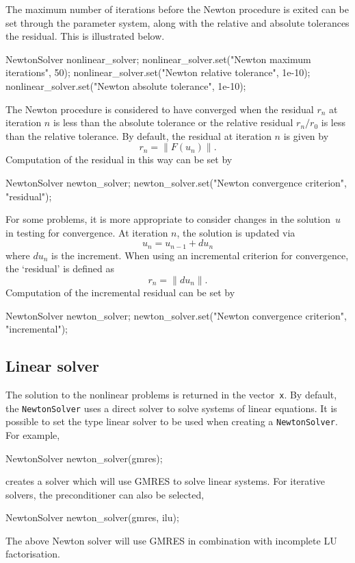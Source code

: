 The maximum number of iterations before the Newton 
procedure is exited can be set through the \dolfin{} parameter
system, along with the relative and absolute 
tolerances the residual. This is illustrated below.
%
\begin{code}
NewtonSolver nonlinear_solver;
nonlinear_solver.set("Newton maximum iterations", 50);
nonlinear_solver.set("Newton relative tolerance", 1e-10);
nonlinear_solver.set("Newton absolute tolerance", 1e-10);
\end{code}

The Newton procedure is considered to have converged when
the residual $r_{n}$ at iteration $n$ is less than the 
absolute tolerance or the relative residual
$r_{n}/r_{0}$ is less than the relative tolerance.
By default, the residual at iteration $n$ is given
by
%
\begin{equation}
  r_{n} = \| F(u_{n}) \|.
\end{equation} 
%
Computation of the residual in this way can be set by
%
\begin{code}
NewtonSolver newton_solver;
newton_solver.set("Newton convergence criterion", "residual");
\end{code}

For some problems, it is more appropriate to consider changes in
the solution~$u$ in testing for convergence. At iteration $n$,
the solution is updated via
%
\begin{equation}
  u_{n} = u_{n-1} + du_{n} 
\end{equation}
%
where $du_{n}$ is the increment. When using an incremental
criterion for convergence, the `residual' is defined as
%
\begin{equation}
  r_{n} = \| du_{n} \|.
\end{equation} 
%
Computation of the incremental residual can be set by
%
\small
\begin{code}
NewtonSolver newton_solver;
newton_solver.set("Newton convergence criterion", "incremental");
\end{code}
\normalsize
\subsection{Linear solver}
The solution to the nonlinear problems is returned in the vector~\texttt{x}.
By default, the \texttt{NewtonSolver} uses a direct solver to solve systems
of linear equations. It is possible to set the type linear solver to be used 
when creating a \texttt{NewtonSolver}. For example, 
%
\begin{code}
NewtonSolver newton_solver(gmres);
\end{code}
%
creates a solver which will use GMRES to solve linear systems. For iterative
solvers, the preconditioner can also be selected,
\begin{code}
NewtonSolver newton_solver(gmres, ilu);
\end{code}
%
The above Newton solver will use GMRES in combination with incomplete LU 
factorisation.
